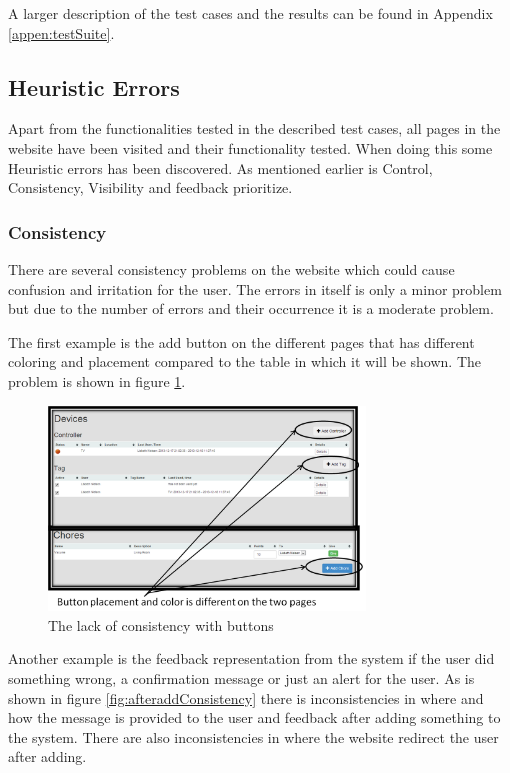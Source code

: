A larger description of the test cases and the results can be found in Appendix \ref{appen:testSuite}.

\subsection{Heuristic Errors}
 Apart from the functionalities tested in the described test cases, all pages in the website have been visited and their functionality tested. When doing this some Heuristic errors has been discovered. As mentioned earlier is Control, Consistency, Visibility and feedback prioritize.


\subsubsection{Consistency}
There are several consistency problems on the website which could cause confusion and irritation for the user. The errors in itself is only a minor problem but due to the number of errors and their occurrence it is a moderate problem.   

The first example is the add button on the different pages that has different coloring and placement compared to the table in which it will be shown. The problem is shown in figure \ref{fig:consistencyButton}.

\begin{figure}
	\centering
		\includegraphics[width=0.75\textwidth]{images/consistencyButton.png}
	\caption{The lack of consistency with buttons}
	\label{fig:consistencyButton}
\end{figure}


Another example is the feedback representation from the system if the user did something wrong, a confirmation message or just an alert for the user. As is shown in figure \ref{fig:afteraddConsistency} there is inconsistencies in where and how the message is provided to the user and feedback after adding something to the system. There are also inconsistencies in where the website redirect the user after adding.

